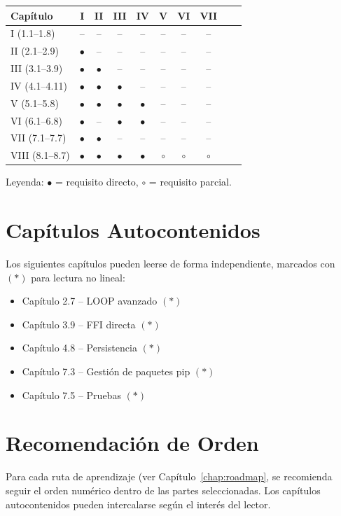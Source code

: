 \begin{center}
\small
\begin{tabular}{lccccccccc}
\toprule
\textbf{Capítulo} & \textbf{I} & \textbf{II} & \textbf{III} & \textbf{IV} & \textbf{V} & \textbf{VI} & \textbf{VII} \\
\midrule
I (1.1--1.8) & -- & -- & -- & -- & -- & -- & -- \\
II (2.1--2.9) & $\bullet$ & -- & -- & -- & -- & -- & -- \\
III (3.1--3.9) & $\bullet$ & $\bullet$ & -- & -- & -- & -- & -- \\
IV (4.1--4.11) & $\bullet$ & $\bullet$ & $\bullet$ & -- & -- & -- & -- \\
V (5.1--5.8) & $\bullet$ & $\bullet$ & $\bullet$ & $\bullet$ & -- & -- & -- \\
VI (6.1--6.8) & $\bullet$ & -- & $\bullet$ & $\bullet$ & -- & -- & -- \\
VII (7.1--7.7) & $\bullet$ & $\bullet$ & -- & -- & -- & -- & -- \\
VIII (8.1--8.7) & $\bullet$ & $\bullet$ & $\bullet$ & $\bullet$ & $\circ$ & $\circ$ & $\circ$ \\
\bottomrule
\end{tabular}
\end{center}

Leyenda: $\bullet$ = requisito directo, $\circ$ = requisito parcial.

\section{Capítulos Autocontenidos}

Los siguientes capítulos pueden leerse de forma independiente, marcados con
$(*)$ para lectura no lineal:

\begin{itemize}
\item Capítulo 2.7 -- LOOP avanzado $(*)$
\item Capítulo 3.9 -- FFI directa $(*)$
\item Capítulo 4.8 -- Persistencia $(*)$
\item Capítulo 7.3 -- Gestión de paquetes pip $(*)$
\item Capítulo 7.5 -- Pruebas $(*)$
\end{itemize}

\section{Recomendación de Orden}

Para cada ruta de aprendizaje (ver Capítulo~\ref{chap:roadmap}, se recomienda
seguir el orden numérico dentro de las partes seleccionadas. Los capítulos
autocontenidos pueden intercalarse según el interés del lector.
